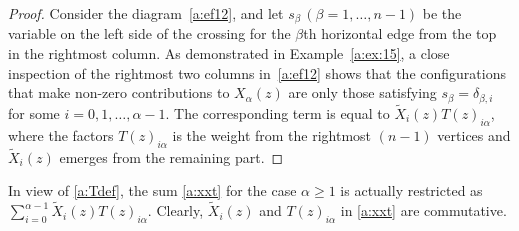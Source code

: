 \documentclass[11pt]{article}
\theoremstyle{definition}
\numberwithin{equation}{section}
\begin{document}
\begin{proof}
Consider the diagram~\eqref{a:ef12}, and let $s_\beta\, (\beta=1,\ldots, n-1)$ be the variable on the left side of the crossing for the $\beta$th horizontal edge from the top in the rightmost column.
As demonstrated in Example~\ref{a:ex:15},  a close inspection of the rightmost two columns in~\eqref{a:ef12} shows that the configurations that make non-zero contributions to $X_\alpha(z)$ are only those satisfying $s_\beta = \delta_{\beta, i}$ for some $i=0,1,\ldots, \alpha-1$. 
The corresponding term is equal to $\widetilde{X}_i(z) T(z)_{i\alpha}$, where the factors $T(z)_{i\alpha}$ is the weight from the rightmost  $(n\!-\!1)$ vertices and $\widetilde{X}_i(z)$ emerges from the remaining part. 
 \end{proof}
 
 In view of \eqref{a:Tdef}, the sum \eqref{a:xxt} for the case $\alpha \ge 1$ is actually restricted as
 $\sum_{i=0}^{\alpha-1}\widetilde{X}_i(z) T(z)_{i\alpha}$.
Clearly, $\widetilde{X}_i(z)$ and $T(z)_{i\alpha}$ in \eqref{a:xxt} are commutative. 
\end{document}
